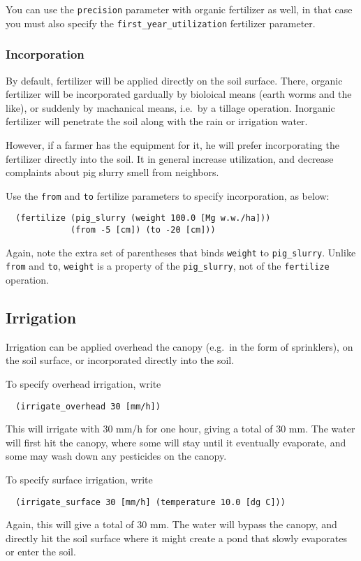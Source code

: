 \documentclass[a4paper,11pt]{article}
\begin{document}
You can use the \texttt{precision} parameter with organic fertilizer
as well, in that case you must also specify the
\texttt{first\_year\_utilization} fertilizer parameter.


\subsubsection{Incorporation}

By default, fertilizer will be applied directly on the soil surface.
There, organic fertilizer will be incorporated gardually by bioloical
means (earth worms and the like), or suddenly by machanical means,
i.e.\ by a tillage operation.  Inorganic fertilizer will penetrate the
soil along with the rain or irrigation water.

However, if a farmer has the equipment for it, he will prefer
incorporating the fertilizer directly into the soil.  It in general
increase utilization, and decrease complaints about pig slurry smell
from neighbors.

Use the \texttt{from} and \texttt{to} fertilize parameters to specify
incorporation, as below:
\begin{verbatim}
  (fertilize (pig_slurry (weight 100.0 [Mg w.w./ha]))
             (from -5 [cm]) (to -20 [cm]))
\end{verbatim}
Again, note the extra set of parentheses that binds \texttt{weight} to
\texttt{pig\_slurry}.  Unlike \texttt{from} and \texttt{to},
\texttt{weight} is a property of the \texttt{pig\_slurry}, not of the
\texttt{fertilize} operation.

\subsection{Irrigation}
\label{sec:irrigation}

Irrigation can be applied overhead the canopy (e.g.\ in the form of
sprinklers), on the soil surface, or incorporated directly into the
soil. 

To specify overhead irrigation, write
\begin{verbatim}
  (irrigate_overhead 30 [mm/h])
\end{verbatim}
This will irrigate with 30 mm/h for one hour, giving a total of 30 mm.
The water will first hit the canopy, where some will stay until it
eventually evaporate, and some may wash down any pesticides on the
canopy.

To specify surface irrigation, write
\begin{verbatim}
  (irrigate_surface 30 [mm/h] (temperature 10.0 [dg C]))
\end{verbatim}
Again, this will give a total of 30 mm.  The water will bypass the
canopy, and directly hit the soil surface where it might create a pond
that slowly evaporates or enter the soil.
\end{document}
